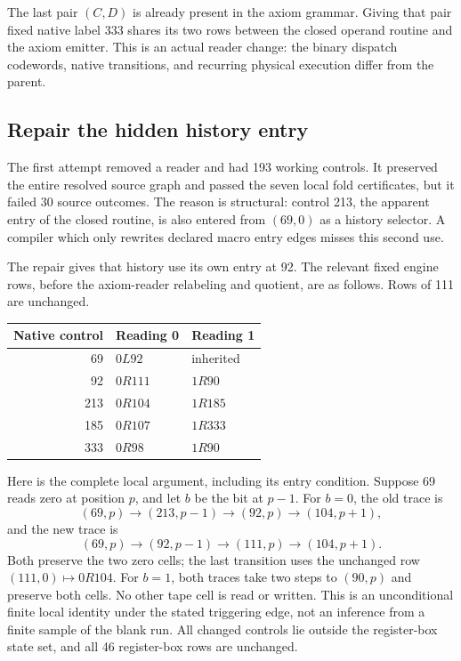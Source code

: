 \documentclass[11pt,a4paper]{article}
\theoremstyle{definition}
\begin{document}
The last pair $(C,D)$ is already present in the axiom grammar. Giving
that pair fixed native label 333 shares its two rows between the closed
operand routine and the axiom emitter. This is an actual reader change:
the binary dispatch codewords, native transitions, and recurring physical
execution differ from the parent.

\subsection{Repair the hidden history entry}
The first attempt removed a reader and had 193 working controls. It
preserved the entire resolved source graph and passed the seven local
fold certificates, but it failed 30 source outcomes. The reason is
structural: control 213, the apparent entry of the closed routine,
is also entered from $(69,0)$ as a history selector. A compiler which
only rewrites declared macro entry edges misses this second use.

The repair gives that history use its own entry at 92. The relevant
fixed engine rows, before the axiom-reader relabeling and quotient,
are as follows. Rows of 111 are unchanged.
\begin{center}
\begin{tabular}{rll}
\toprule
Native control & Reading 0 & Reading 1\\
\midrule
69 & $0L92$ & inherited\\
92 & $0R111$ & $1R90$\\
213 & $0R104$ & $1R185$\\
185 & $0R107$ & $1R333$\\
333 & $0R98$ & $1R90$\\
\bottomrule
\end{tabular}
\end{center}

Here is the complete local argument, including its entry condition.
Suppose 69 reads zero at position $p$, and let $b$ be the bit at $p-1$.
For $b=0$, the old trace is
\[
  (69,p)\longrightarrow(213,p-1)\longrightarrow(92,p)
                \longrightarrow(104,p+1),
\]
and the new trace is
\[
  (69,p)\longrightarrow(92,p-1)\longrightarrow(111,p)
                \longrightarrow(104,p+1).
\]
Both preserve the two zero cells; the last transition uses the unchanged
row $(111,0)\mapsto0R104$. For $b=1$, both traces take two steps to
$(90,p)$ and preserve both cells. No other tape cell is read or written.
This is an unconditional finite local identity under the stated
triggering edge, not an inference from a finite sample of the blank run.
All changed controls lie outside the register-box state set, and all
46 register-box rows are unchanged.
\end{document}
